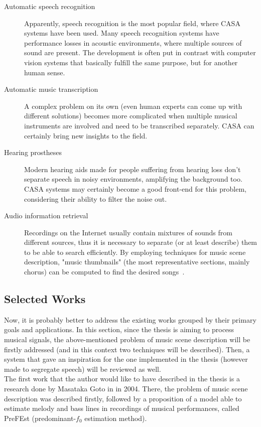 \begin{description}
	\item[Automatic speech recognition] Apparently, speech recognition is the most popular field, where CASA systems have been used. Many speech recognition systems have performance losses in acoustic environments, where multiple sources of sound are present. The development is often put in contrast with computer vision systems that basically fulfill the same purpose, but for another human sense.
	\item[Automatic music transcription] A complex problem on its own (even human experts can come up with different solutions) becomes more complicated when multiple musical instruments are involved and need to be transcribed separately. CASA can certainly bring new insights to the field.
	\item[Hearing prostheses] Modern hearing aids made for people suffering from hearing loss don't separate speech in noisy environments, amplifying the background too. CASA systems may certainly become a good front-end for this problem, considering their ability to filter the noise out.
	\item[Audio information retrieval] Recordings on the Internet usually contain mixtures of sounds from different sources, thus it is necessary to separate (or at least describe) them to be able to search efficiently. By employing techniques for music scene description, "music thumbnails" (the most representative sections, mainly chorus) can be computed to find the desired songs~\cite{Wang2006}.
\end{description}

\subsection{Selected Works}

Now, it is probably better to address the existing works grouped by their primary goals and applications. In this section, since the thesis is aiming to process musical signals, the above-mentioned problem of music scene description will be firstly addressed (and in this context two techniques will be described). Then, a system that gave an inspiration for the one implemented in the thesis (however made to segregate speech) will be reviewed as well.\\

The first work that the author would like to have described in the thesis is a research done by Masataka Goto in \cite{Goto2004} in 2004. There, the problem of music scene description was described firstly, followed by a proposition of a model able to estimate melody and bass lines in recordings of musical performances, called PreFEst (predominant-$f_0$ estimation method).\\

